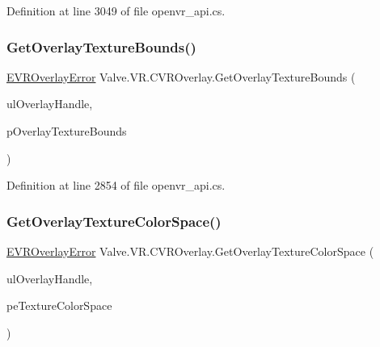 Definition at line 3049 of file openvr\+\_\+api.\+cs.

\mbox{\label{class_valve_1_1_v_r_1_1_c_v_r_overlay_ab347e37cf63cc5481f6a629212126e5d}} 
\subsubsection{\texorpdfstring{GetOverlayTextureBounds()}{GetOverlayTextureBounds()}}
{\footnotesize\ttfamily \mbox{\hyperlink{namespace_valve_1_1_v_r_aaee5c5144f42b7969d45b854f51b0c18}{E\+V\+R\+Overlay\+Error}} Valve.\+V\+R.\+C\+V\+R\+Overlay.\+Get\+Overlay\+Texture\+Bounds (\begin{DoxyParamCaption}\item[{ulong}]{ul\+Overlay\+Handle,  }\item[{ref \mbox{\hyperlink{struct_valve_1_1_v_r_1_1_v_r_texture_bounds__t}{V\+R\+Texture\+Bounds\+\_\+t}}}]{p\+Overlay\+Texture\+Bounds }\end{DoxyParamCaption})}



Definition at line 2854 of file openvr\+\_\+api.\+cs.

\mbox{\label{class_valve_1_1_v_r_1_1_c_v_r_overlay_a4d83986df1c1bc6596e827f20d3d3c41}} 
\subsubsection{\texorpdfstring{GetOverlayTextureColorSpace()}{GetOverlayTextureColorSpace()}}
{\footnotesize\ttfamily \mbox{\hyperlink{namespace_valve_1_1_v_r_aaee5c5144f42b7969d45b854f51b0c18}{E\+V\+R\+Overlay\+Error}} Valve.\+V\+R.\+C\+V\+R\+Overlay.\+Get\+Overlay\+Texture\+Color\+Space (\begin{DoxyParamCaption}\item[{ulong}]{ul\+Overlay\+Handle,  }\item[{ref \mbox{\hyperlink{namespace_valve_1_1_v_r_aeb0fba37ba28d8ca276d7c10f01809ac}{E\+Color\+Space}}}]{pe\+Texture\+Color\+Space }\end{DoxyParamCaption})}




